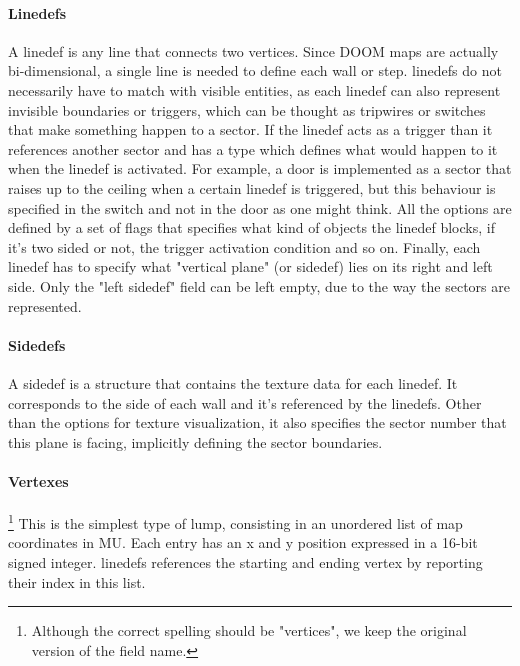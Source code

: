 \paragraph{Linedefs} A \gls{linedef} is any line that connects two vertices. Since DOOM maps are actually bi-dimensional, a single line is needed to define each wall or step. \glspl{linedef} do not necessarily have to match with visible entities, as each \gls{linedef} can also represent invisible boundaries or triggers, which can be thought as tripwires or switches that make something happen to a sector. If the \gls{linedef} acts as a trigger than it references another sector and has a type which defines what would happen to it when the \gls{linedef} is activated. For example, a door is implemented as a sector that raises up to the ceiling when a certain \gls{linedef} is triggered, but this behaviour is specified in the switch and not in the door as one might think. All the options are defined by a set of flags that specifies what kind of objects the \gls{linedef} blocks, if it's two sided or not, the trigger activation condition and so on.
Finally, each \gls{linedef} has to specify what "vertical plane" (or \gls{sidedef}) lies on its right and left side. Only the "left sidedef" field can be left empty, due to the way the sectors are represented.

\paragraph{Sidedefs} A \gls{sidedef} is a structure that contains the texture data for each linedef. It corresponds to the side of each wall and it's referenced by the linedefs. Other than the options for texture visualization, it also specifies the sector number that this plane is facing, implicitly defining the sector boundaries.

\paragraph{Vertexes}\footnote{Although the correct spelling should be "vertices", we keep the original version of the field name.} This is the simplest type of \gls{lump}, consisting in an unordered list of map coordinates in \gls{MU}. Each entry has an x and y position expressed in a 16-bit signed integer. \glspl{linedef} references the starting and ending vertex by reporting their index in this list.

